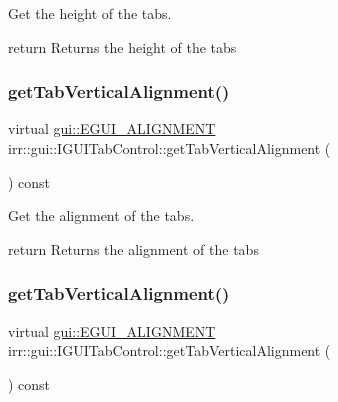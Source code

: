 Get the height of the tabs. 

return Returns the height of the tabs \mbox{\label{classirr_1_1gui_1_1IGUITabControl_a3153a7dba26548eda6a8013e1e669c18}} 
\subsubsection{\texorpdfstring{get\+Tab\+Vertical\+Alignment()}{getTabVerticalAlignment()}\hspace{0.1cm}{\footnotesize\ttfamily [1/2]}}
{\footnotesize\ttfamily virtual \hyperlink{namespaceirr_1_1gui_a19eb5fb40e67f108cb16aba922ddaa2d}{gui\+::\+E\+G\+U\+I\+\_\+\+A\+L\+I\+G\+N\+M\+E\+NT} irr\+::gui\+::\+I\+G\+U\+I\+Tab\+Control\+::get\+Tab\+Vertical\+Alignment (\begin{DoxyParamCaption}{ }\end{DoxyParamCaption}) const\hspace{0.3cm}{\ttfamily [pure virtual]}}



Get the alignment of the tabs. 

return Returns the alignment of the tabs \mbox{\label{classirr_1_1gui_1_1IGUITabControl_a3153a7dba26548eda6a8013e1e669c18}} 
\subsubsection{\texorpdfstring{get\+Tab\+Vertical\+Alignment()}{getTabVerticalAlignment()}\hspace{0.1cm}{\footnotesize\ttfamily [2/2]}}
{\footnotesize\ttfamily virtual \hyperlink{namespaceirr_1_1gui_a19eb5fb40e67f108cb16aba922ddaa2d}{gui\+::\+E\+G\+U\+I\+\_\+\+A\+L\+I\+G\+N\+M\+E\+NT} irr\+::gui\+::\+I\+G\+U\+I\+Tab\+Control\+::get\+Tab\+Vertical\+Alignment (\begin{DoxyParamCaption}{ }\end{DoxyParamCaption}) const\hspace{0.3cm}{\ttfamily [pure virtual]}}



